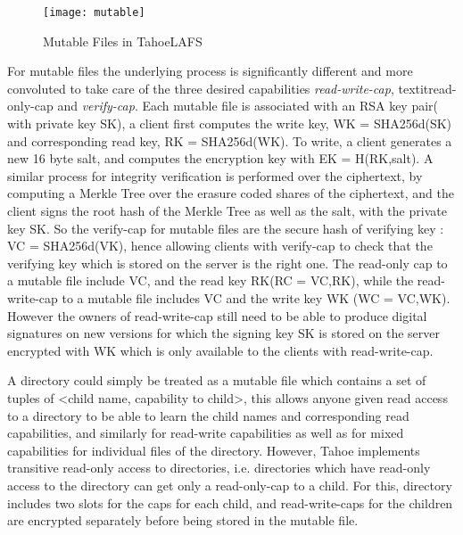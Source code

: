 \begin{figure}[h]
\centering
\texttt{[image: mutable]}
\caption{Mutable Files in TahoeLAFS}
\label{fig:mutable}
\end{figure}

For mutable files the underlying process is significantly different and more convoluted to take care of the three desired capabilities \textit{read-write-cap}, textit{read-only-cap} and \textit{verify-cap}. Each mutable file is associated with an RSA key pair( with private key SK), a client first computes the write key, WK = SHA256d(SK) and corresponding read key, RK = SHA256d(WK). To write, a client generates a new 16 byte salt, and computes the encryption key with EK = H(RK,salt). A similar process for integrity verification is performed over the ciphertext, by computing a Merkle Tree over the erasure coded shares of the ciphertext, and the client signs the root hash of the Merkle Tree as well as the salt, with the private key SK. So the verify-cap for mutable files are the secure hash of verifying key : VC = SHA256d(VK), hence allowing clients with verify-cap to check that the verifying key which is stored on the server is the right one. The read-only cap to a mutable file include VC, and the read key RK(RC = VC,RK), while the read-write-cap to a mutable file includes VC and the write key WK (WC = VC,WK). However the owners of read-write-cap still need to be able to produce digital signatures on new versions for which the signing key SK is stored on the server encrypted with WK which is only available to the clients with read-write-cap. 

A directory could simply be treated as a mutable file which contains a set of tuples of <child name, capability to child>, this allows anyone given read access to a directory to be able to learn the child names and corresponding read capabilities, and similarly for read-write capabilities as well as for mixed capabilities for individual files of the directory. However, Tahoe implements transitive read-only access to directories, i.e. directories which have read-only access to the directory can get only a read-only-cap to a child. For this, directory includes two slots for the caps for each child, and read-write-caps for the children are encrypted separately before being stored in the mutable file.

